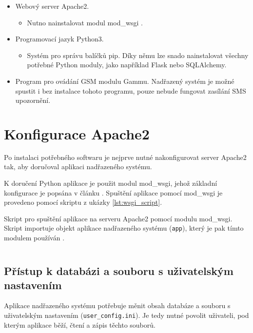 \begin{itemize}
    \item Webový server Apache2.
    \begin{itemize}
        \item Nutno nainstalovat modul mod\_wsgi  \cite{mod_wsgi}.
    \end{itemize}
    \item Programovací jazyk Python3.
    \begin{itemize}
        \item Systém pro správu balíčků pip. Díky němu lze snado nainstalovat všechny potřebné Python moduly, jako například Flask nebo SQLAlchemy.
    \end{itemize}
    \item Program pro ovádání GSM modulu Gammu. Nadřazený systém je možné spustit i bez instalace tohoto programu, pouze nebude fungovat zasílání SMS upozornění.
\end{itemize}

\newpage

\section{Konfigurace Apache2}

Po instalaci potřebného softwaru je nejprve nutné nakonfigurovat server Apache2 tak, aby doručoval aplikaci nadřazeného systému. 

K doručení Python aplikace je použit modul mod\_wsgi, jehož základní konfigurace je popsána v článku \cite{flask_wsgi}. Spuštění aplikace pomocí mod\_wsgi je provedeno pomocí skriptu z ukázky \ref{lst:wsgi_script}.

\begin{listing}[htbp]
\caption{\label{lst:wsgi_script} Skript pro spuštění aplikace na serveru Apache2 pomocí modulu mod\_wsgi. Skript importuje objekt aplikace nadřazeného systému (\texttt{app}), který je pak tímto modulem používán \cite{flask_wsgi}.}
\inputminted[bgcolor=codebg]{python}{source-samples/wsgi.py}
\end{listing}

\newpage

\subsection{Přístup k databázi a souboru s uživatelským nastavením}

Aplikace nadřazeného systému potřebuje měnit obsah databáze a souboru s uživatelským nastavením (\texttt{user\_config.ini}). Je tedy nutné povolit uživateli, pod kterým aplikace běží, čtení a zápis těchto souborů. 

